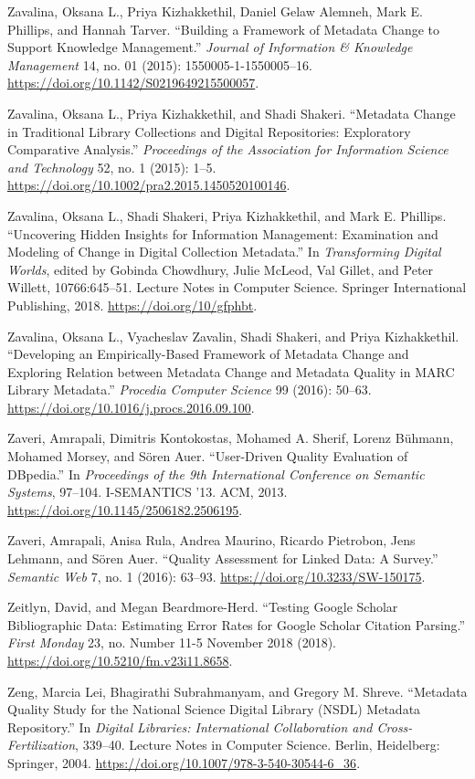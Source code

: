 Zavalina, Oksana L., Priya Kizhakkethil, Daniel Gelaw Alemneh, Mark E. Phillips, and Hannah Tarver. “Building a Framework of Metadata Change to Support Knowledge Management.” \emph{Journal of Information \& Knowledge Management} 14, no. 01 (2015): 1550005-1-1550005–16. \url{https://doi.org/10.1142/S0219649215500057}.

Zavalina, Oksana L., Priya Kizhakkethil, and Shadi Shakeri. “Metadata Change in Traditional Library Collections and Digital Repositories: Exploratory Comparative Analysis.” \emph{Proceedings of the Association for Information Science and Technology} 52, no. 1 (2015): 1–5. \url{https://doi.org/10.1002/pra2.2015.1450520100146}.

Zavalina, Oksana L., Shadi Shakeri, Priya Kizhakkethil, and Mark E. Phillips. “Uncovering Hidden Insights for Information Management: Examination and Modeling of Change in Digital Collection Metadata.” In \emph{Transforming Digital Worlds}, edited by Gobinda Chowdhury, Julie McLeod, Val Gillet, and Peter Willett, 10766:645–51. Lecture Notes in Computer Science. Springer International Publishing, 2018. \url{https://doi.org/10/gfphbt}.

Zavalina, Oksana L., Vyacheslav Zavalin, Shadi Shakeri, and Priya Kizhakkethil. “Developing an Empirically-Based Framework of Metadata Change and Exploring Relation between Metadata Change and Metadata Quality in MARC Library Metadata.” \emph{Procedia Computer Science} 99 (2016): 50–63. \url{https://doi.org/10.1016/j.procs.2016.09.100}.

Zaveri, Amrapali, Dimitris Kontokostas, Mohamed A. Sherif, Lorenz Bühmann, Mohamed Morsey, and Sören Auer. “User-Driven Quality Evaluation of DBpedia.” In \emph{Proceedings of the 9th International Conference on Semantic Systems}, 97–104. I-SEMANTICS ’13. ACM, 2013. \url{https://doi.org/10.1145/2506182.2506195}.

Zaveri, Amrapali, Anisa Rula, Andrea Maurino, Ricardo Pietrobon, Jens Lehmann, and Sören Auer. “Quality Assessment for Linked Data: A Survey.” \emph{Semantic Web} 7, no. 1 (2016): 63–93. \url{https://doi.org/10.3233/SW-150175}.

Zeitlyn, David, and Megan Beardmore-Herd. “Testing Google Scholar Bibliographic Data: Estimating Error Rates for Google Scholar Citation Parsing.” \emph{First Monday} 23, no. Number 11-5 November 2018 (2018). \url{https://doi.org/10.5210/fm.v23i11.8658}.

Zeng, Marcia Lei, Bhagirathi Subrahmanyam, and Gregory M. Shreve. “Metadata Quality Study for the National Science Digital Library (NSDL) Metadata Repository.” In \emph{Digital Libraries: International Collaboration and Cross-Fertilization}, 339–40. Lecture Notes in Computer Science. Berlin, Heidelberg: Springer, 2004. \url{https://doi.org/10.1007/978-3-540-30544-6_36}.


